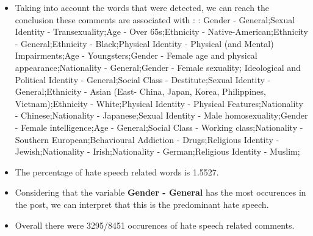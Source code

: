 \documentclass[11pt]{article}
\begin{document}
\begin{itemize}\item Taking into account the words that were detected, we can reach the conclusion these comments are associated with : : Gender - General;Sexual Identity - Transexuality;Age - Over 65s;Ethnicity - Native-American;Ethnicity - General;Ethnicity - Black;Physical Identity - Physical (and Mental) Impairments;Age - Youngsters;Gender - Female age and physical appearance;Nationality - General;Gender - Female sexuality; Ideological and Political Identity - General;Social Class - Destitute;Sexual Identity - General;Ethnicity - Asian (East- China, Japan, Korea, Philippines, Vietnam);Ethnicity - White;Physical Identity - Physical Features;Nationality - Chinese;Nationality - Japanese;Sexual Identity - Male homosexuality;Gender - Female intelligence;Age - General;Social Class - Working class;Nationality - Southern European;Behavioural Addiction - Drugs;Religious Identity - Jewish;Nationality - Irish;Nationality - German;Religious Identity - Muslim;%

\item The percentage of hate speech related words is 1.5527.

\item Considering that the variable \textbf{Gender - General} has the most occurences in the post, we can interpret that this is the predominant hate speech.

\item Overall there were 3295/8451 occurences of hate speech related comments.\end{itemize}
\end{document}
